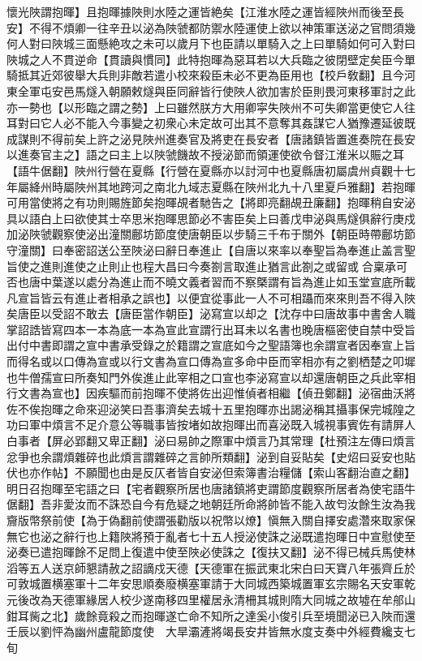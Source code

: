 懷光陜謂抱暉】且抱暉據陜則水陸之運皆絶矣【江淮水陸之運皆經陜州而後至長安】不得不煩卿一往辛丑以泌為陜虢都防禦水陸運使上欲以神策軍送泌之官問須幾何人對曰陜城三面懸絶攻之未可以歲月下也臣請以單騎入之上曰單騎如何可入對曰陜城之人不貫逆命【貫讀與慣同】此特抱暉為惡耳若以大兵臨之彼閉壁定矣臣今單騎抵其近郊彼舉大兵則非敵若遣小校來殺臣未必不更為臣用也【校戶敎翻】且今河東全軍屯安邑馬燧入朝願敕燧與臣同辭皆行使陜人欲加害於臣則畏河東移軍討之此亦一勢也【以形臨之謂之勢】上曰雖然朕方大用卿寜失陜州不可失卿當更使它人往耳對曰它人必不能入今事變之初衆心未定故可出其不意奪其姦謀它人猶豫遷延彼既成謀則不得前矣上許之泌見陜州進奏官及將吏在長安者【唐諸鎮皆置進奏院在長安以進奏官主之】語之曰主上以陜虢饑故不授泌節而領運使欲令督江淮米以賑之耳【語牛倨翻】陜州行營在夏縣【行營在夏縣亦以討河中也夏縣唐初屬虞州貞觀十七年屬絳州時屬陜州其地跨河之南北九域志夏縣在陜州北九十八里夏戶雅翻】若抱暉可用當使將之有功則賜旌節矣抱暉覘者馳告之【將即亮翻覘丑廉翻】抱暉稍自安泌具以語白上曰欲使其士卒思米抱暉思節必不害臣矣上曰善戊申泌與馬燧俱辭行庚戍加泌陜虢觀察使泌出潼關鄜坊節度使唐朝臣以步騎三千布于關外【朝臣時帶鄜坊節守潼關】曰奉密詔送公至陜泌曰辭日奉進止【自唐以來率以奉聖旨為奉進止盖言聖旨使之進則進使之止則止也程大昌曰今奏劄言取進止猶言此劄之或留或合稟承可否也唐中葉遂以處分為進止而不曉文義者習而不察槩謂有旨為進止如玉堂宣底所載凡宣旨皆云有進止者相承之誤也】以便宜從事此一人不可相躡而來來則吾不得入陜矣唐臣以受詔不敢去【唐臣當作朝臣】泌寫宣以却之【沈存中曰唐故事中書舍人職掌詔誥皆寫四本一本為底一本為宣此宣謂行出耳未以名書也晚唐樞密使自禁中受旨出付中書即謂之宣中書承受錄之於籍謂之宣底如今之聖語簿也余謂宣者因奉宣上旨而得名或以口傳為宣或以行文書為宣口傳為宣多命中臣而宰相亦有之劉栖楚之叩墀也牛僧孺宣曰所奏知門外俟進止此宰相之口宣也李泌寫宣以却還唐朝臣之兵此宰相行文書為宣也】因疾驅而前抱暉不使將佐出迎惟偵者相繼【偵丑鄭翻】泌宿曲沃將佐不俟抱暉之命來迎泌笑曰吾事濟矣去城十五里抱暉亦出謁泌稱其攝事保完城隍之功曰軍中煩言不足介意公等職事皆按堵如故抱暉出而喜泌既入城視事賓佐有請屏人白事者【屏必郢翻又卑正翻】泌曰易帥之際軍中煩言乃其常理【杜預注左傳曰煩言忿爭也余謂煩雜碎也此煩言謂雜碎之言帥所類翻】泌到自妥貼矣【史炤曰妥安也貼伏也亦作帖】不願聞也由是反仄者皆自安泌但索簿書治糧儲【索山客翻治直之翻】明日召抱暉至宅語之曰【宅者觀察所居也唐諸鎮將吏謂節度觀察所居者為使宅語牛倨翻】吾非愛汝而不誅恐自今有危疑之地朝廷所命將帥皆不能入故匄汝餘生汝為我齎版幣祭前使【為于偽翻前使謂張勸版以祝幣以燎】愼無入關自擇安處濳來取家保無它也泌之辭行也上籍陜將預于亂者七十五人授泌使誅之泌既遣抱暉日中宣慰使至泌奏已遣抱暉餘不足問上復遣中使至陜必使誅之【復扶又翻】泌不得已械兵馬使林滔等五人送京師懇請赦之詔謫戍天德【天德軍在振武東北宋白曰天寶八年張齊丘於可敦城置横塞軍十二年安思順奏廢横塞軍請于大同城西築城置軍玄宗賜名天安軍乾元後改為天德軍緣居人校少遂南移四里權居永清柵其城則隋大同城之故墟在牟郍山鉗耳胔之北】歲餘竟殺之而抱暉遂亡命不知所之達奚小俊引兵至境聞泌已入陜而還　壬辰以劉怦為幽州盧龍節度使　大旱灞滻將竭長安井皆無水度支奏中外經費纔支七旬

